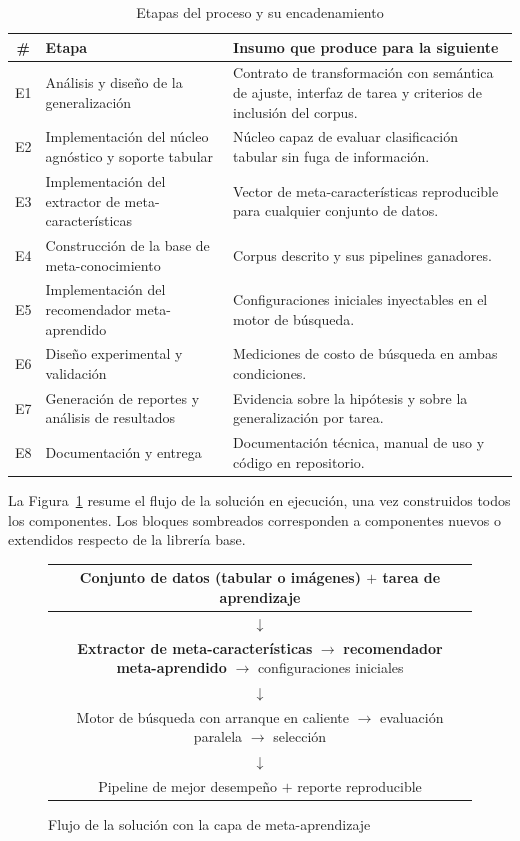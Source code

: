 \documentclass[12pt,letterpaper,oneside]{article}
\begin{document}
\begin{table}[H]
\centering
\small
\caption{Etapas del proceso y su encadenamiento}
\label{tab:etapas}
\begin{tabularx}{\textwidth}{>{}C>{}L>{}L}
\toprule
\textbf{\#} & \textbf{Etapa} & \textbf{Insumo que produce para la siguiente} \\
\midrule
E1 & Análisis y diseño de la generalización &
Contrato de transformación con semántica de ajuste, interfaz de tarea y criterios de
inclusión del corpus. \\
\addlinespace
E2 & Implementación del núcleo agnóstico y soporte tabular &
Núcleo capaz de evaluar clasificación tabular sin fuga de información. \\
\addlinespace
E3 & Implementación del extractor de meta-características &
Vector de meta-características reproducible para cualquier conjunto de datos. \\
\addlinespace
E4 & Construcción de la base de meta-conocimiento &
Corpus descrito y sus pipelines ganadores. \\
\addlinespace
E5 & Implementación del recomendador meta-aprendido &
Configuraciones iniciales inyectables en el motor de búsqueda. \\
\addlinespace
E6 & Diseño experimental y validación &
Mediciones de costo de búsqueda en ambas condiciones. \\
\addlinespace
E7 & Generación de reportes y análisis de resultados &
Evidencia sobre la hipótesis y sobre la generalización por tarea. \\
\addlinespace
E8 & Documentación y entrega &
Documentación técnica, manual de uso y código en repositorio. \\
\bottomrule
\end{tabularx}
\end{table}

La Figura~\ref{fig:flujo-solucion} resume el flujo de la solución en ejecución, una vez
construidos todos los componentes. Los bloques sombreados corresponden a componentes
nuevos o extendidos respecto de la librería base.

\begin{figure}[H]
\centering
\begin{tabularx}{0.95\textwidth}{C}
\toprule
Conjunto de datos (tabular o imágenes) $+$ tarea de aprendizaje \\
\midrule
$\downarrow$ \\
\midrule
\textbf{Extractor de meta-características} $\rightarrow$
\textbf{recomendador meta-aprendido} $\rightarrow$ configuraciones iniciales \\
\midrule
$\downarrow$ \\
\midrule
Motor de búsqueda con arranque en caliente $\rightarrow$ evaluación paralela
$\rightarrow$ selección \\
\midrule
$\downarrow$ \\
\midrule
Pipeline de mejor desempeño $+$ reporte reproducible \\
\bottomrule
\end{tabularx}
\caption{Flujo de la solución con la capa de meta-aprendizaje}
\label{fig:flujo-solucion}
\end{figure}
\end{document}
